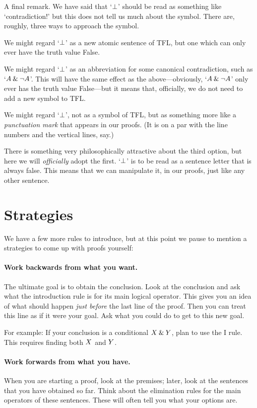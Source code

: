 A final remark. We have said that `$\bot$' should be read as something like `contradiction!' but this does not tell us much about the symbol. There are, roughly, three ways to approach the symbol. 
	\begin{ebullet}
		\item We might regard `$\bot$' as a new atomic sentence of TFL, but one which can only ever have the truth value False. 
		\item We might regard `$\bot$' as an abbreviation for some canonical contradiction, such as `$A \mathbin{\&} \neg A$'. This will have the same effect as the above---obviously, `$A \mathbin{\&} \neg A$' only ever has the truth value False---but it means that, officially, we do not need to add a new symbol to TFL.
		\item We might regard `$\bot$', not as a symbol of TFL, but as something more like a \emph{punctuation mark} that appears in our proofs. (It is on a par with the line numbers and the vertical lines, say.)
	\end{ebullet}
There is something very philosophically attractive about the third option, but here we will \emph{officially} adopt the first. `$\bot$' is to be read as a sentence letter that is always false. This means that we can manipulate it, in our proofs, just like any other sentence.

\section{Strategies}
We have a few more rules to introduce, but at this point we pause to mention a strategies to come up with proofs yourself:

\paragraph{Work backwards from what you want.}
The ultimate goal is to obtain the conclusion. Look at the conclusion and ask what the introduction rule is for its main logical operator. This gives you an idea of what should happen \emph{just before} the last line of the proof. Then you can treat this line as if it were your goal. Ask what you could do to get to this new goal.

For example: If your conclusion is a conditional $X\mathbin{\&}Y$, plan to use the {\eand}I rule. This requires finding both $X$ and $Y$.

\paragraph{Work forwards from what you have.}
When you are starting a proof, look at the premises; later, look at the sentences that you have obtained so far. Think about the elimination rules for the main operators of these sentences. These will often tell you what your options are.

